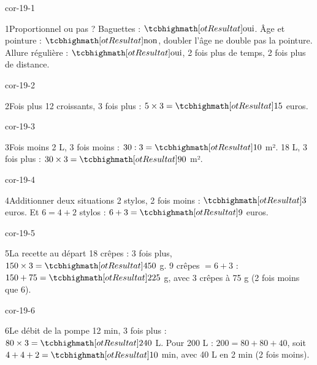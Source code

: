 \clearpage\pagestyle{otMain}\setlength{\otBlocEspacement}{2.5mm}\fontsize{11}{15}\selectfont{}
\begin{blocLivre}{cor-19-1}\begin{corrige}{1}{Proportionnel ou pas ?}
Baguettes : $\res{\text{oui}}$. Âge et pointure : $\res{\text{non}}$, doubler l’âge ne double pas la pointure. Allure régulière : $\res{\text{oui}}$, 2 fois plus de temps, 2 fois plus de distance.
\end{corrige}\end{blocLivre}
\begin{blocLivre}{cor-19-2}\begin{corrige}{2}{Fois plus}
12 croissants, 3 fois plus : $5\times3=\res{15}$ euros.
\end{corrige}\end{blocLivre}
\begin{blocLivre}{cor-19-3}\begin{corrige}{3}{Fois moins}
2 L, 3 fois moins : $30:3=\res{10}$ m². 18 L, 3 fois plus : $30\times3=\res{90}$ m².
\end{corrige}\end{blocLivre}
\begin{blocLivre}{cor-19-4}\begin{corrige}{4}{Additionner deux situations}
2 stylos, 2 fois moins : $\res3$ euros. Et $6=4+2$ stylos : $6+3=\res9$ euros.
\end{corrige}\end{blocLivre}
\begin{blocLivre}{cor-19-5}\begin{corrige}{5}{La recette au départ}
18 crêpes : 3 fois plus, $150\times3=\res{450}$ g. 9 crêpes $=6+3$ : $150+75=\res{225}$ g, avec 3 crêpes à 75 g (2 fois moins que 6).
\end{corrige}\end{blocLivre}
\begin{blocLivre}{cor-19-6}\begin{corrige}{6}{Le débit de la pompe}
12 min, 3 fois plus : $80\times3=\res{240}$ L. Pour 200 L : $200=80+80+40$, soit $4+4+2=\res{10}$ min, avec 40 L en 2 min (2 fois moins).
\end{corrige}\end{blocLivre}

